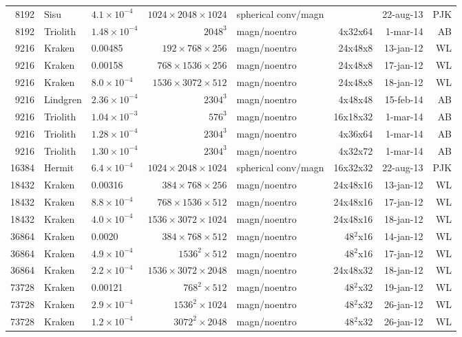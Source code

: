 \documentclass[\mydriver,12pt,twoside,notitlepage,a4paper]{article}
\begin{document}
\begin{center}
\begin{footnotesize}
\begin{longtable}{rllrlrrr}
8192&Sisu&$4.1{\!\times\!}10^{-4}$&$1024{\!\times\!}2048{\!\times\!}1024$&spherical conv/magn& &22-aug-13&PJK\\
8192&Triolith&$1.48{\!\times\!}10^{-4}$&$2048^3$&magn/noentro&4x32x64& 1-mar-14 & AB \\
9216& Kraken&  0.00485 &$192{\!\times\!}768{\!\times\!}256$ & magn/noentro & 24x48x8 &13-jan-12 & WL\\
9216& Kraken& 0.00158   &$768{\!\times\!}1536{\!\times\!}256$ & magn/noentro & 24x48x8 &17-jan-12 & WL\\
9216& Kraken& $8.0{\!\times\!}10^{-4}$  &$1536{\!\times\!}3072{\!\times\!}512$ & magn/noentro & 24x48x8 &18-jan-12 & WL\\
9216&Lindgren&$2.36{\!\times\!}10^{-4}$&$2304^3$&magn/noentro&4x48x48&15-feb-14&AB\\
9216&Triolith&$1.04{\!\times\!}10^{-3}$&$ 576^3$&magn/noentro&16x18x32& 1-mar-14 & AB \\
9216&Triolith&$1.28{\!\times\!}10^{-4}$&$2304^3$&magn/noentro&4x36x64& 1-mar-14 & AB \\
9216&Triolith&$1.30{\!\times\!}10^{-4}$&$2304^3$&magn/noentro&4x32x72& 1-mar-14 & AB \\
16384&Hermit&$6.4{\!\times\!}10^{-4}$&$1024{\!\times\!}2048{\!\times\!}1024$&spherical conv/magn&16x32x32&22-aug-13&PJK\\
18432 & Kraken& 0.00316  &$384{\!\times\!}768{\!\times\!}256$ & magn/noentro & 24x48x16 &13-jan-12 & WL\\
18432 & Kraken&$8.8{\!\times\!}10^{-4}$  &$768{\!\times\!}1536{\!\times\!}512$ & magn/noentro & 24x48x16 &17-jan-12 & WL\\
18432 & Kraken& $4.0{\!\times\!}10^{-4}$ &$1536{\!\times\!}3072{\!\times\!}1024$ & magn/noentro & 24x48x16 &18-jan-12 & WL\\
36864 & Kraken& 0.0020  &$384{\!\times\!}768{\!\times\!}512$ & magn/noentro & 48$^2$x16 &14-jan-12 & WL\\
36864 & Kraken& $4.9{\!\times\!}10^{-4}$  &$1536^2{\!\times\!}512$ & magn/noentro & 48$^2$x16 &17-jan-12 & WL\\
36864 & Kraken& $2.2{\!\times\!}10^{-4}$  &$1536{\!\times\!}3072{\!\times\!}2048$ & magn/noentro & 24x48x32 &18-jan-12 & WL\\
73728 & Kraken& 0.00121  &$768^2{\!\times\!}512$ & magn/noentro & 48$^2$x32 &19-jan-12 & WL\\
73728 & Kraken& $2.9{\!\times\!}10^{-4}$ &$1536^2{\!\times\!}1024$ & magn/noentro & 48$^2$x32 &26-jan-12 & WL\\
73728 & Kraken& $1.2{\!\times\!}10^{-4}$  &$3072^2{\!\times\!}2048$ & magn/noentro & 48$^2$x32 &26-jan-12 & WL\\
\bottomrule
  \end{longtable}
    \end{footnotesize}
  \end{center}
\normalsize
\end{document}
